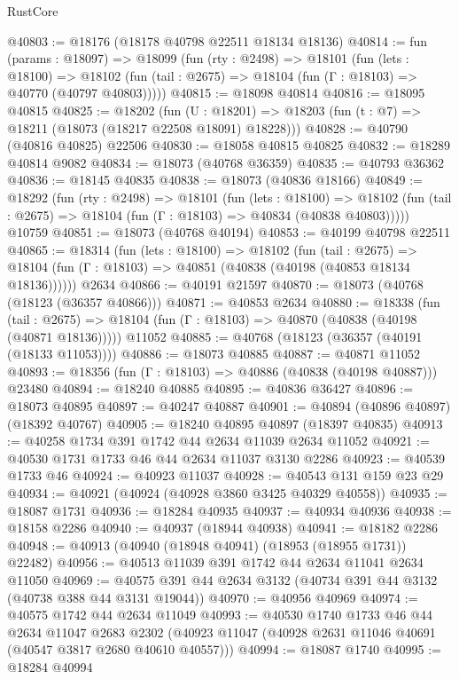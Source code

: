 \begin{lexlean}{RustCore}
\begin{coremodule}
@40803 := @18176 (@18178 @40798 @22511 @18134 @18136)
@40814 := fun (params : @18097) =>
  @18099
    (fun (rty : @2498) =>
    @18101
      (fun (lets : @18100) =>
      @18102 (fun (tail : @2675) => @18104 (fun (Γ : @18103) => @40770 (@40797 @40803)))))
@40815 := @18098 @40814
@40816 := @18095 @40815
@40825 := @18202
    (fun (U : @18201) => @18203 (fun (t : @7) => @18211 (@18073 (@18217 @22508 @18091) @18228)))
@40828 := @40790 (@40816 @40825) @22506
@40830 := @18058 @40815 @40825
@40832 := @18289 @40814 @9082
@40834 := @18073 (@40768 @36359)
@40835 := @40793 @36362
@40836 := @18145 @40835
@40838 := @18073 (@40836 @18166)
@40849 := @18292
    (fun (rty : @2498) =>
    @18101
      (fun (lets : @18100) =>
      @18102 (fun (tail : @2675) => @18104 (fun (Γ : @18103) => @40834 (@40838 @40803)))))
    @10759
@40851 := @18073 (@40768 @40194)
@40853 := @40199 @40798 @22511
@40865 := @18314
    (fun (lets : @18100) =>
    @18102
      (fun (tail : @2675) =>
      @18104 (fun (Γ : @18103) => @40851 (@40838 (@40198 (@40853 @18134 @18136))))))
    @2634
@40866 := @40191 @21597
@40870 := @18073 (@40768 (@18123 (@36357 @40866)))
@40871 := @40853 @2634
@40880 := @18338
    (fun (tail : @2675) => @18104 (fun (Γ : @18103) => @40870 (@40838 (@40198 (@40871 @18136)))))
    @11052
@40885 := @40768 (@18123 (@36357 (@40191 (@18133 @11053))))
@40886 := @18073 @40885
@40887 := @40871 @11052
@40893 := @18356 (fun (Γ : @18103) => @40886 (@40838 (@40198 @40887))) @23480
@40894 := @18240 @40885
@40895 := @40836 @36427
@40896 := @18073 @40895
@40897 := @40247 @40887
@40901 := @40894 (@40896 @40897) (@18392 @40767)
@40905 := @18240 @40895 @40897 (@18397 @40835)
@40913 := @40258 @1734 @391 @1742 @44 @2634 @11039 @2634 @11052
@40921 := @40530 @1731 @1733 @46 @44 @2634 @11037 @3130 @2286
@40923 := @40539 @1733 @46
@40924 := @40923 @11037
@40928 := @40543 @131 @159 @23 @29
@40934 := @40921 (@40924 (@40928 @3860 @3425 @40329 @40558))
@40935 := @18087 @1731
@40936 := @18284 @40935
@40937 := @40934 @40936
@40938 := @18158 @2286
@40940 := @40937 (@18944 @40938)
@40941 := @18182 @2286
@40948 := @40913 (@40940 (@18948 @40941) (@18953 (@18955 @1731)) @22482)
@40956 := @40513 @11039 @391 @1742 @44 @2634 @11041 @2634 @11050
@40969 := @40575 @391 @44 @2634 @3132 (@40734 @391 @44 @3132 (@40738 @388 @44 @3131 @19044))
@40970 := @40956 @40969
@40974 := @40575 @1742 @44 @2634 @11049
@40993 := @40530
    @1740
    @1733
    @46
    @44
    @2634
    @11047
    @2683
    @2302
    (@40923 @11047 (@40928 @2631 @11046 @40691 (@40547 @3817 @2680 @40610 @40557)))
@40994 := @18087 @1740
@40995 := @18284 @40994

\end{coremodule}
\end{lexlean}

